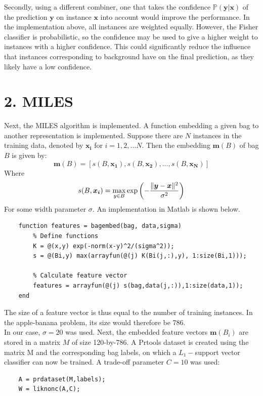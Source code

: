 \documentclass [a4paper] {report}
\begin{document}
	\noindent
	Secondly, using a different combiner, one that takes the confidence $\mathbb{P}(\bm{y}|\bm{x})$ of the prediction $\bm{y}$ on instance $\bm{x}$ into account would improve the performance. In the implementation above, all instances are weighted equally. However, the Fisher classifier is probabilistic, so the confidence may be used to give a higher weight to instances with a higher confidence. This could significantly reduce the influence that instances corresponding to background have on the final prediction, as they likely have a low confidence.
	
	
	
	\section*{2. MILES}
	Next, the MILES algorithm is implemented. A function embedding a given bag to another representation is implemented. Suppose there are $N$ instances in the training data, denoted by $\bm{x_{i}}$ for $ i=1,2,...N$. Then the embedding $\bm{m}(B)$ of bag $B$ is given by:
	$$ \bm{m}(B) = \left[ s(B,\bm{x_{1}}),s(B,\bm{x_{2}}), ..., s(B,\bm{x_{N}}) \right] $$
	Where 
	$$ s(B,\bm{x_{i}}) = \max_{y\in B} \exp\left(- {\| \bm{y}-\bm{x}\|^{2} \over \sigma^{2}}\right) $$
	For some width parameter $\sigma$. An implementation in Matlab is shown below.
	
	\begin{lstlisting}
	function features = bagembed(bag, data,sigma)
		% Define functions
		K = @(x,y) exp(-norm(x-y)^2/(sigma^2));
		s = @(Bi,y) max(arrayfun(@(j) K(Bi(j,:),y), 1:size(Bi,1)));
		
		% Calculate feature vector
		features = arrayfun(@(j) s(bag,data(j,:)),1:size(data,1));
	end
	\end{lstlisting}
	
	\noindent
	The size of a feature vector is thus equal to the number of training instances. In the apple-banana problem, its size would therefore be 786.\\
	In our case, $\sigma=20$ was used. Next, the embedded feature vectors $\bm{m}(B_{i})$ are stored in a matrix $M$ of size 120-by-786. A Prtools dataset is created using the matrix M and the corresponding bag labels, on which a $L_{1}-$support vector classifier can now be trained. A trade-off parameter $C=10$ was used:
	\begin{lstlisting}
	A = prdataset(M,labels);
	W = liknonc(A,C);
	\end{lstlisting}
	
\end{document}
